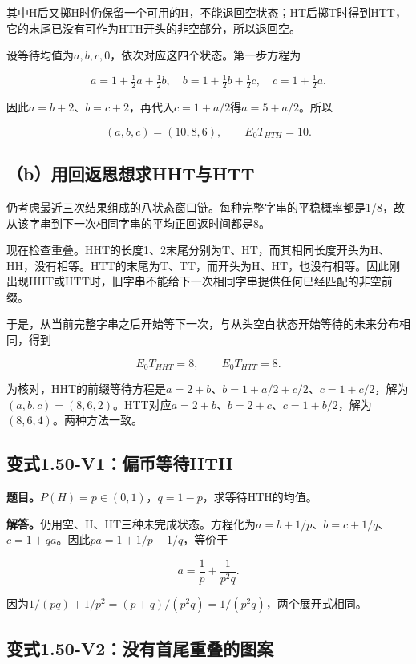 \documentclass[
  11pt,
  a4paper,
  UTF8,
  fontset=fandol]{ctexart}
\begin{document}
其中H后又掷H时仍保留一个可用的H，不能退回空状态；HT后掷T时得到HTT，它的末尾已没有可作为HTH开头的非空部分，所以退回空。

设等待均值为\(a,b,c,0\)，依次对应这四个状态。第一步方程为

\[
a=1+\tfrac12a+\tfrac12b,\quad
b=1+\tfrac12b+\tfrac12c,\quad
c=1+\tfrac12a.
\]

因此\(a=b+2\)、\(b=c+2\)，再代入\(c=1+a/2\)得\(a=5+a/2\)。所以

\[
\boxed{(a,b,c)=(10,8,6),\qquad E_0T_{HTH}=10.}
\]

\subsection{（b）用回返思想求HHT与HTT}\label{bux7528ux56deux8fd4ux601dux60f3ux6c42hhtux4e0ehtt}

仍考虑最近三次结果组成的八状态窗口链。每种完整字串的平稳概率都是1/8，故从该字串到下一次相同字串的平均正回返时间都是8。

现在检查重叠。HHT的长度1、2末尾分别为T、HT，而其相同长度开头为H、HH，没有相等。HTT的末尾为T、TT，而开头为H、HT，也没有相等。因此刚出现HHT或HTT时，旧字串不能给下一次相同字串提供任何已经匹配的非空前缀。

于是，从当前完整字串之后开始等下一次，与从头空白状态开始等待的未来分布相同，得到

\[
\boxed{E_0T_{HHT}=8,\qquad E_0T_{HTT}=8.}
\]

为核对，HHT的前缀等待方程是\(a=2+b\)、\(b=1+a/2+c/2\)、\(c=1+c/2\)，解为\((a,b,c)=(8,6,2)\)。HTT对应\(a=2+b\)、\(b=2+c\)、\(c=1+b/2\)，解为\((8,6,4)\)。两种方法一致。

\subsection{变式1.50-V1：偏币等待HTH}\label{ux53d8ux5f0f1.50-v1ux504fux5e01ux7b49ux5f85hth}

\textbf{题目。}\(P(H)=p\in(0,1)\)，\(q=1-p\)，求等待HTH的均值。

\textbf{解答。}仍用空、H、HT三种未完成状态。方程化为\(a=b+1/p\)、\(b=c+1/q\)、\(c=1+qa\)。因此\(pa=1+1/p+1/q\)，等价于

\[
\boxed{a=\frac1p+\frac1{p^2q}.}
\]

因为\(1/(pq)+1/p^2=(p+q)/(p^2q)=1/(p^2q)\)，两个展开式相同。

\subsection{变式1.50-V2：没有首尾重叠的图案}\label{ux53d8ux5f0f1.50-v2ux6ca1ux6709ux9996ux5c3eux91cdux53e0ux7684ux56feux6848}
\end{document}

